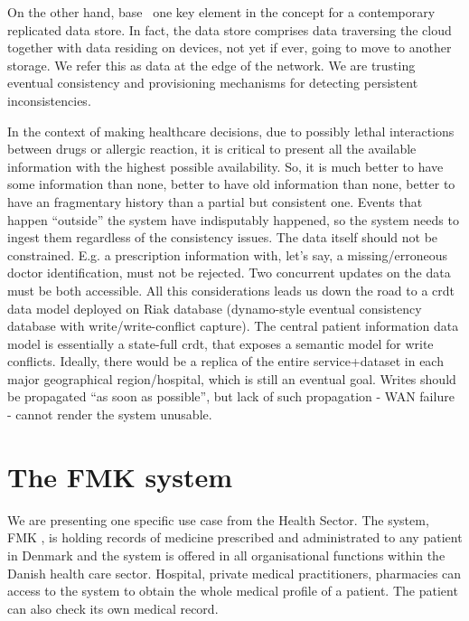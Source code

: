 \documentclass[english]{article}
\begin{document}
On the other hand, \gls{base}~\cite{pritchett2008base} one key element in the concept for a contemporary replicated data store. In fact, the data store comprises data traversing the cloud together with data residing on devices, not yet if ever, going to move to another storage. We refer this as
data at the edge of the network. We are trusting eventual consistency and provisioning mechanisms for detecting persistent inconsistencies.

In the context of making healthcare decisions, due to possibly lethal interactions between drugs or allergic reaction, it is critical to present all the available information with the highest possible availability. So, it is much better to have some information than none, better to have old information than none, better to have an fragmentary history than a partial but consistent one. Events that happen ``outside'' the system have indisputably happened, so the system needs to ingest them regardless of the consistency issues. The data itself should not be constrained. E.g. a prescription information with, let's say, a missing/erroneous doctor identification, must not be rejected. Two concurrent updates on the data must be both accessible.
All this considerations leads us down the road to a \gls{crdt} \cite{shapiro11conflictfree} data model deployed on Riak database (dynamo-style eventual consistency database with write/write-conflict capture).  The central patient information data model is essentially a state-full \gls{crdt}, that exposes a semantic model for write conflicts. Ideally, there would be a replica of the entire service+dataset in each major geographical region/hospital, which is still an eventual goal. Writes should be propagated ``as soon as possible'', but lack of such propagation - WAN failure - cannot render the system unusable.


\section{The FMK system}


We are presenting one specific use case from the Health Sector. The system, FMK \cite{FMK}, is holding records of medicine prescribed and administrated to any patient in Denmark and the system is offered in all organisational functions within the Danish health
care sector. Hospital, private medical practitioners, pharmacies can access to the system to obtain the whole medical profile of a patient. The patient can also check its own medical record.
\end{document}
